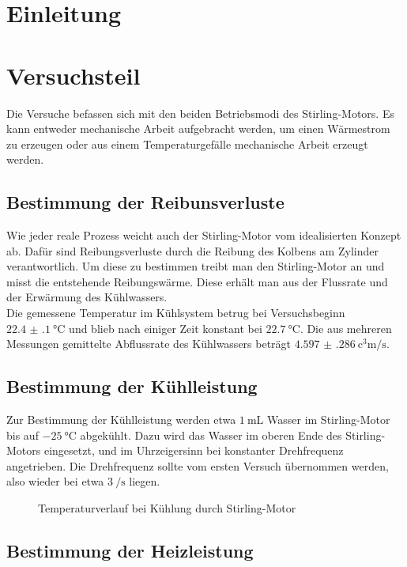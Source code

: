 \section{Einleitung}

\newpage
\section{Versuchsteil}

Die Versuche befassen sich mit den beiden Betriebsmodi des Stirling-Motors. Es kann entweder mechanische Arbeit aufgebracht werden, um einen Wärmestrom zu erzeugen oder aus einem Temperaturgefälle mechanische Arbeit erzeugt werden. 

\subsection{Bestimmung der Reibunsverluste}
Wie jeder reale Prozess weicht auch der Stirling-Motor vom idealisierten Konzept ab. Dafür sind Reibungsverluste durch die Reibung des Kolbens am Zylinder verantwortlich. Um diese zu bestimmen treibt man den Stirling-Motor an und misst die entstehende Reibungswärme. Diese erhält man aus der Flussrate und der Erwärmung des Kühlwassers. \\
Die gemessene Temperatur im Kühlsystem betrug bei Versuchsbeginn $ \SI{22.4(1)}{\degreeCelsius} $ und blieb nach einiger Zeit konstant bei $ \SI{22.7}{\degreeCelsius} $. Die aus mehreren Messungen gemittelte Abflussrate des Kühlwassers beträgt $ \SI{4.597(286)}{\cubic\centi\meter\per\second} $.

\subsection{Bestimmung der Kühlleistung}

Zur Bestimmung der Kühlleistung werden etwa $ \SI{1}{\milli\liter} $ Wasser im Stirling-Motor bis auf $ \SI{-25}{\degreeCelsius} $ abgekühlt. Dazu wird das Wasser im oberen Ende des Stirling-Motors eingesetzt, und im Uhrzeigersinn bei konstanter Drehfrequenz angetrieben. Die Drehfrequenz sollte vom ersten Versuch übernommen werden, also wieder bei etwa $ \SI{3}{\per\second} $ liegen. 

\begin{figure}[h!]
	\centering
	
	\caption{Temperaturverlauf bei Kühlung durch Stirling-Motor}
	\label{fig:a2T}
\end{figure}

\subsection{Bestimmung der Heizleistung}

